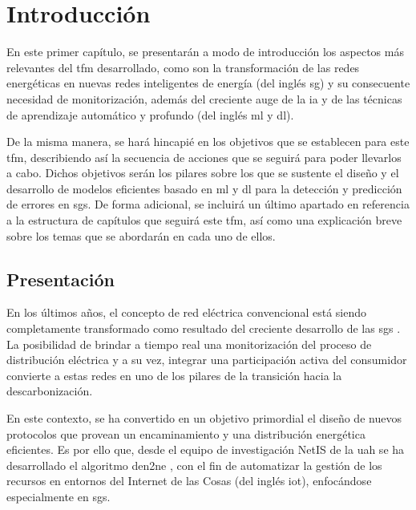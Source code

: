 
\chapter{Introducción}
\label{ch:intro}

En este primer capítulo, se presentarán a modo de introducción los aspectos más relevantes del \gls{tfm} desarrollado, como son la transformación de las redes energéticas en nuevas redes inteligentes de energía (del inglés \gls{sg}) y su consecuente necesidad de monitorización, además del creciente auge de la \gls{ia} y de las técnicas de aprendizaje automático y profundo (del inglés \gls{ml} y \gls{dl}).

\vspace{3mm}

De la misma manera, se hará hincapié en los objetivos que se establecen para este \gls{tfm}, describiendo así la secuencia de acciones que se seguirá para poder llevarlos a cabo. Dichos objetivos serán los pilares sobre los que se sustente el diseño y el desarrollo de modelos eficientes basado en \gls{ml} y \gls{dl} para la detección y predicción de errores en \gls{sg}s. De forma adicional, se incluirá un último apartado en referencia a la estructura de capítulos que seguirá este \gls{tfm}, así como una explicación breve sobre los temas que se abordarán en cada uno de ellos.


\section{Presentación}
\label{sec:presentacion}

En los últimos años, el concepto de red eléctrica convencional está siendo completamente transformado como resultado del creciente desarrollo de las \gls{sg}s \cite{repsol} \cite{impact}. La posibilidad de brindar a tiempo real una monitorización del proceso de distribución eléctrica y a su vez, integrar una participación activa del consumidor convierte a estas redes en uno de los pilares de la transición hacia la descarbonización. 

\vspace{3mm}

En este contexto, se ha convertido en un objetivo primordial el diseño de nuevos protocolos que provean un encaminamiento y una distribución energética eficientes. Es por ello que, desde el equipo de investigación NetIS de la \gls{uah} se ha desarrollado el algoritmo \gls{den2ne} \cite{den2ne}, con el fin de automatizar la gestión de los recursos en entornos del Internet de las Cosas (del inglés \gls{iot}), enfocándose especialmente en \gls{sg}s.  

